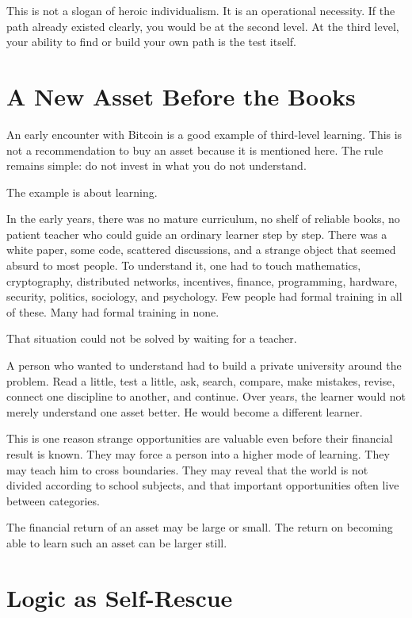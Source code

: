This is not a slogan of heroic individualism. It is an operational necessity. If the path already existed clearly, you would be at the second level. At the third level, your ability to find or build your own path is the test itself.

\section*{A New Asset Before the Books}

An early encounter with Bitcoin is a good example of third-level learning. This is not a recommendation to buy an asset because it is mentioned here. The rule remains simple: do not invest in what you do not understand.

The example is about learning.

In the early years, there was no mature curriculum, no shelf of reliable books, no patient teacher who could guide an ordinary learner step by step. There was a white paper, some code, scattered discussions, and a strange object that seemed absurd to most people. To understand it, one had to touch mathematics, cryptography, distributed networks, incentives, finance, programming, hardware, security, politics, sociology, and psychology. Few people had formal training in all of these. Many had formal training in none.

That situation could not be solved by waiting for a teacher.

A person who wanted to understand had to build a private university around the problem. Read a little, test a little, ask, search, compare, make mistakes, revise, connect one discipline to another, and continue. Over years, the learner would not merely understand one asset better. He would become a different learner.

This is one reason strange opportunities are valuable even before their financial result is known. They may force a person into a higher mode of learning. They may teach him to cross boundaries. They may reveal that the world is not divided according to school subjects, and that important opportunities often live between categories.

The financial return of an asset may be large or small. The return on becoming able to learn such an asset can be larger still.

\section*{Logic as Self-Rescue}

